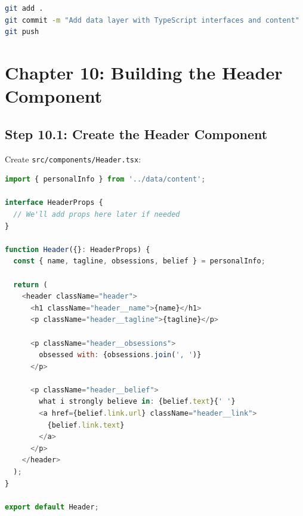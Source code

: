 \documentclass[12pt,a4paper]{article}
\begin{document}
\begin{gitcommit}
\begin{lstlisting}[language=bash]
git add .
git commit -m "Add data layer with TypeScript interfaces and content"
git push
\end{lstlisting}
\end{gitcommit}

\section{Chapter 10: Building the Header Component}

\subsection{Step 10.1: Create the Header Component}

Create \texttt{src/components/Header.tsx}:

\begin{lstlisting}[language=JavaScript,caption={src/components/Header.tsx}]
import { personalInfo } from '../data/content';

interface HeaderProps {
  // We'll add props here later if needed
}

function Header({}: HeaderProps) {
  const { name, tagline, obsessions, belief } = personalInfo;

  return (
    <header className="header">
      <h1 className="header__name">{name}</h1>
      <p className="header__tagline">{tagline}</p>

      <p className="header__obsessions">
        obsessed with: {obsessions.join(', ')}
      </p>

      <p className="header__belief">
        what i strongly believe in: {belief.text}{' '}
        <a href={belief.link.url} className="header__link">
          {belief.link.text}
        </a>
      </p>
    </header>
  );
}

export default Header;
\end{lstlisting}
\end{document}

